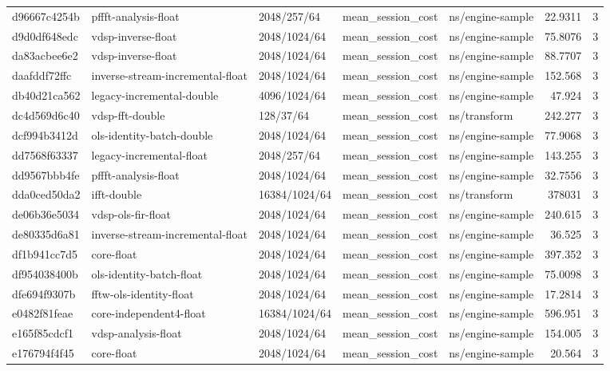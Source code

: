 \begin{longtable}{lllllrr}
d96667c4254b & pffft-analysis-float & 2048/257/64 & mean\_session\_cost & ns/engine-sample & 22.9311 & 3 \\
d9d0df648edc & vdsp-inverse-float & 2048/1024/64 & mean\_session\_cost & ns/engine-sample & 75.8076 & 3 \\
da83acbee6e2 & vdsp-inverse-float & 2048/1024/64 & mean\_session\_cost & ns/engine-sample & 88.7707 & 3 \\
daafddf72ffc & inverse-stream-incremental-float & 2048/1024/64 & mean\_session\_cost & ns/engine-sample & 152.568 & 3 \\
db40d21ca562 & legacy-incremental-double & 4096/1024/64 & mean\_session\_cost & ns/engine-sample & 47.924 & 3 \\
dc4d569d6c40 & vdsp-fft-double & 128/37/64 & mean\_session\_cost & ns/transform & 242.277 & 3 \\
dcf994b3412d & ols-identity-batch-double & 2048/1024/64 & mean\_session\_cost & ns/engine-sample & 77.9068 & 3 \\
dd7568f63337 & legacy-incremental-float & 2048/257/64 & mean\_session\_cost & ns/engine-sample & 143.255 & 3 \\
dd9567bbb4fe & pffft-analysis-float & 2048/1024/64 & mean\_session\_cost & ns/engine-sample & 32.7556 & 3 \\
dda0ced50da2 & ifft-double & 16384/1024/64 & mean\_session\_cost & ns/transform & 378031 & 3 \\
de06b36e5034 & vdsp-ols-fir-float & 2048/1024/64 & mean\_session\_cost & ns/engine-sample & 240.615 & 3 \\
de80335d6a81 & inverse-stream-incremental-float & 2048/1024/64 & mean\_session\_cost & ns/engine-sample & 36.525 & 3 \\
df1b941cc7d5 & core-float & 2048/1024/64 & mean\_session\_cost & ns/engine-sample & 397.352 & 3 \\
df954038400b & ols-identity-batch-float & 2048/1024/64 & mean\_session\_cost & ns/engine-sample & 75.0098 & 3 \\
dfe694f9307b & fftw-ols-identity-float & 2048/1024/64 & mean\_session\_cost & ns/engine-sample & 17.2814 & 3 \\
e0482f81feae & core-independent4-float & 16384/1024/64 & mean\_session\_cost & ns/engine-sample & 596.951 & 3 \\
e165f85cdcf1 & vdsp-analysis-float & 2048/1024/64 & mean\_session\_cost & ns/engine-sample & 154.005 & 3 \\
e176794f4f45 & core-float & 2048/1024/64 & mean\_session\_cost & ns/engine-sample & 20.564 & 3 \\

\end{longtable}
